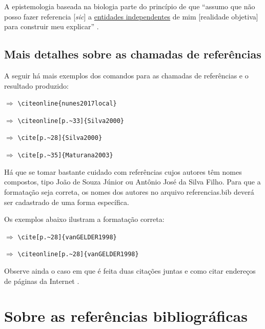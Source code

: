 \begin{apendicesenv}
    A epistemologia baseada na biologia parte do princípio de que ``assumo que não posso fazer referencia [\textit{sic}] a \underline{entidades independentes} de mim [realidade objetiva] para construir meu explicar'' \cite[p.~35, comentários e grifo nosso]{Maturana2003}.

    \section{Mais detalhes sobre as chamadas de referências}
    \label{sec_chamadas_referencias}

    A seguir há mais exemplos dos comandos para as chamadas de referências e o resultado produzido:

     $\Longrightarrow$ \verb|\citeonline{nunes2017local}|

     $\Longrightarrow$ \verb|\citeonline[p.~33]{Silva2000}|

    \cite[p.~28]{Silva2000} $\Longrightarrow$ \verb|\cite[p.~28]{Silva2000}|

    \cite[p.~35]{Maturana2003} $\Longrightarrow$ \verb|\cite[p.~35]{Maturana2003}|

    \vspace{3em}

    Há que se tomar bastante cuidado com referências cujos autores têm nomes compostos, tipo João de Souza Júnior ou Antônio José da Silva Filho.
    Para que a formatação seja correta, os nomes dos autores no arquivo {\color{red} referencias.bib} deverá ser cadastrado de uma forma específica.

    Os exemplos abaixo ilustram a formatação correta:

    \cite[p.~28]{vanGELDER1998} $\Longrightarrow$ \verb|\cite[p.~28]{vanGELDER1998}|

     $\Longrightarrow$ \verb|\citeonline[p.~28]{vanGELDER1998}|

    \vspace{3em}

    Observe ainda o caso em que é feita duas citações juntas \cite{Silva2000, nunes2017local} e como citar endereços de páginas da Internet \cite{IRL2014}.


    \chapter{Sobre as referências bibliográficas}
    \label{chap_sobre_as_referencias_bibliograficas}


\end{apendicesenv}
